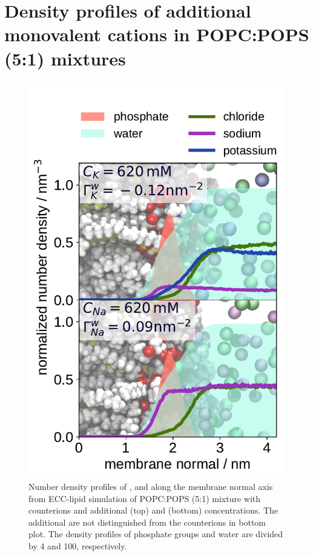 \documentclass[journal=jpcbfk,manuscript=article]{achemso}
\newlength{\figwidth}
\begin{document}
\section{Density profiles of additional monovalent cations in POPC:POPS (5:1) mixtures}
\begin{figure}[!h] 
  \centering 
  \includegraphics[width=\figwidth]{../img/ecc_pops/density_profiles_na_k_cl_wat_phos_models-compar_5-6_NaCl-and-KCl-series.pdf}
  \caption{\label{fig:nacl-dens_PCPS} 
    Number density profiles of ,  and  along the membrane normal axis
    from ECC-lipid simulation of POPC:POPS (5:1) mixture with  counterions and
    additional  (top) and  (bottom) concentrations.
    The additional  are not distinguished from the counterions in bottom plot.
    The density profiles of phosphate groups and water are divided by 4 and 100, respectively.  
  }
\end{figure} 
\end{document}
